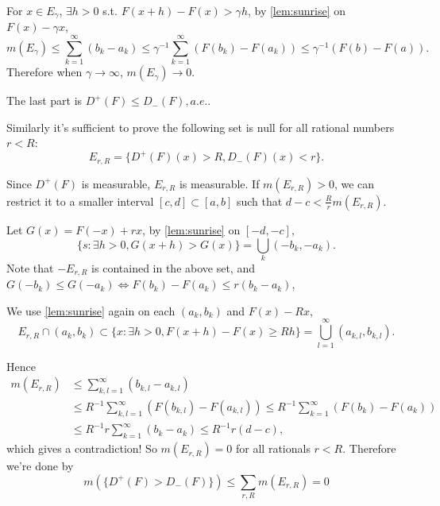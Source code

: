 For $x\in E_\gamma$,  $\exists h>0$ s.t. $F(x+h)-F(x) > \gamma h$,
by \autoref{lem:sunrise} on  $F(x)-\gamma x$,
\[
	m(E_\gamma) \le \sum_{k=1}^{\infty} (b_k - a_k)
	\le \gamma^{-1}\sum_{k=1}^{\infty} (F(b_k)-F(a_k))\le \gamma^{-1}(F(b)-F(a)).
\]
Therefore when $\gamma\to \infty$, $m(E_\gamma)\to 0$.

The last part is $D^+(F)\le D_-(F),a.e.$.

Similarly it's sufficient to prove the following set is null
for all rational numbers $r<R$:
 \[
E_{r, R} = \{D^+(F)(x)>R, D_-(F)(x)<r\}.
\]

Since $D^+(F)$ is measurable, $E_{r,R}$ is measurable.
If $m(E_{r,R})>0$, we can restrict it to
a smaller interval $[c,d] \subset [a,b]$ such that
$d-c<\frac{R}{r}m(E_{r,R})$.

Let $G(x) = F(-x) + rx$, by \autoref{lem:sunrise} on $[-d,-c]$,
 \[
\{s: \exists h>0, G(x+h)>G(x)\} = \bigcup_k (-b_k, -a_k).
\]
Note that $-E_{r,R}$ is contained in the above set,
and $G(-b_k)\le G(-a_k)\iff F(b_k) - F(a_k)\le r(b_k - a_k)$,

We use \autoref{lem:sunrise} again on each $(a_k, b_k)$ and $F(x)-Rx$,
 \[
E_{r,R}\cap (a_k,b_k) \subset \{x: \exists h>0, F(x+h)-F(x)\ge Rh\}
= \bigcup_{l=1}^\infty (a_{k,l}, b_{k,l}).
\]

Hence
\begin{align*}
	m(E_{r,R}) &\le \sum_{k,l=1}^{\infty}(b_{k,l}-a_{k,l})\\
	&\le R^{-1} \sum_{k,l=1}^{\infty}(F(b_{k,l}) - F(a_{k,l}))
	\le R^{-1} \sum_{k=1}^{\infty}(F(b_k) - F(a_k))\\
	&\le R^{-1} r \sum_{k=1}^{\infty}(b_k - a_k) \le R^{-1}r (d-c),
\end{align*}
which gives a contradiction!
So $m(E_{r,R}) = 0$ for all rationals $r<R$.
Therefore we're done by
\[
m(\{D^+(F)>D_-(F)\})\le \sum_{r,R} m(E_{r,R}) = 0
\]


